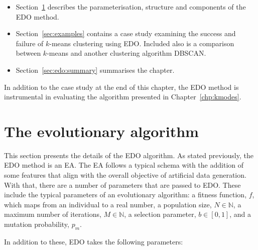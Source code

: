 \begin{itemize}
    \item Section~\ref{sec:algorithm} describes the parameterisation, structure
        and components of the EDO method.
    \item Section~\ref{sec:examples} contains a case study examining the success
        and failure of \(k\)-means clustering using EDO. Included also is a
        comparison between \(k\)-means and another clustering algorithm DBSCAN.\
    \item Section~\ref{sec:edo:summary} summarises the chapter.
\end{itemize}

In addition to the case study at the end of this chapter, the EDO method is
instrumental in evaluating the algorithm presented in Chapter~\ref{chp:kmodes}.

\section{The evolutionary algorithm}\label{sec:algorithm}

This section presents the details of the EDO algorithm. As stated previously,
the EDO method is an EA. The EA follows a typical schema with the addition of
some features that align with the overall objective of artificial data
generation. With that, there are a number of parameters that are passed to EDO.
These include the typical parameters of an evolutionary algorithm: a fitness
function, \(f\), which maps from an individual to a real number, a population
size, \(N \in \mathbb N\), a maximum number of iterations, \(M \in \mathbb N\),
a selection parameter, \(b \in [0, 1]\), and a mutation probability, \(p_m\).

In addition to these, EDO takes the following parameters:

